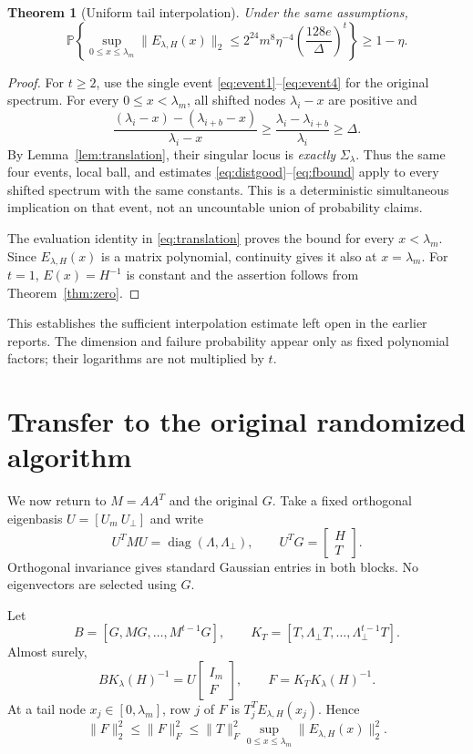 \documentclass[11pt]{article}
\numberwithin{equation}{section}
\newtheorem{theorem}{Theorem}[section]
\theoremstyle{definition}
\newcommand{\Prob}{\mathbb P}
\newcommand{\diag}{\operatorname{diag}}
\newcommand{\nn}[1]{\lVert #1\rVert}
\begin{document}
\begin{theorem}[Uniform tail interpolation]\label{thm:uniform}
Under the same assumptions,
\begin{equation}\label{eq:uniform}
\Prob\left\{\sup_{0\le x\le\lambda_m}\nn{E_{\lambda,H}(x)}_2
\le 2^{24}m^8\eta^{-4}\left(\frac{128e}{\Delta}\right)^t\right\}\ge1-\eta.
\end{equation}
\end{theorem}
\begin{proof}
For $t\ge2$, use the single event \eqref{eq:event1}--\eqref{eq:event4} for the original spectrum. For every $0\le x<\lambda_m$, all shifted nodes $\lambda_i-x$ are positive and
\[
\frac{(\lambda_i-x)-(\lambda_{i+b}-x)}{\lambda_i-x}
\ge\frac{\lambda_i-\lambda_{i+b}}{\lambda_i}\ge\Delta.
\]
By Lemma~\ref{lem:translation}, their singular locus is \emph{exactly} $\Sigma_\lambda$. Thus the same four events, local ball, and estimates \eqref{eq:distgood}--\eqref{eq:fbound} apply to every shifted spectrum with the same constants. This is a deterministic simultaneous implication on that event, not an uncountable union of probability claims.

The evaluation identity in \eqref{eq:translation} proves the bound for every $x<\lambda_m$. Since $E_{\lambda,H}(x)$ is a matrix polynomial, continuity gives it also at $x=\lambda_m$. For $t=1$, $E(x)=H^{-1}$ is constant and the assertion follows from Theorem~\ref{thm:zero}.
\end{proof}

This establishes the sufficient interpolation estimate left open in the earlier reports. The dimension and failure probability appear only as fixed polynomial factors; their logarithms are not multiplied by $t$.

\section{Transfer to the original randomized algorithm}\label{sec:algorithm}
We now return to $M=AA^T$ and the original $G$. Take a fixed orthogonal eigenbasis $U=[U_m\ U_\perp]$ and write
\[
U^TMU=\diag(\Lambda,\Lambda_\perp),\qquad
U^TG=\begin{bmatrix}H\\T\end{bmatrix}.
\]
Orthogonal invariance gives standard Gaussian entries in both blocks. No eigenvectors are selected using $G$.

Let
\[
B=[G,MG,\ldots,M^{t-1}G],\qquad
K_T=[T,\Lambda_\perp T,\ldots,\Lambda_\perp^{t-1}T].
\]
Almost surely,
\begin{equation}\label{eq:graph}
BK_\lambda(H)^{-1}=U\begin{bmatrix}I_m\\F\end{bmatrix},
\qquad F=K_TK_\lambda(H)^{-1}.
\end{equation}
At a tail node $x_j\in[0,\lambda_m]$, row $j$ of $F$ is $T_j^TE_{\lambda,H}(x_j)$. Hence
\begin{equation}\label{eq:graphnorm}
\nn F_2^2\le\nn F_F^2
\le\nn T_F^2\sup_{0\le x\le\lambda_m}\nn{E_{\lambda,H}(x)}_2^2.
\end{equation}
\end{document}

